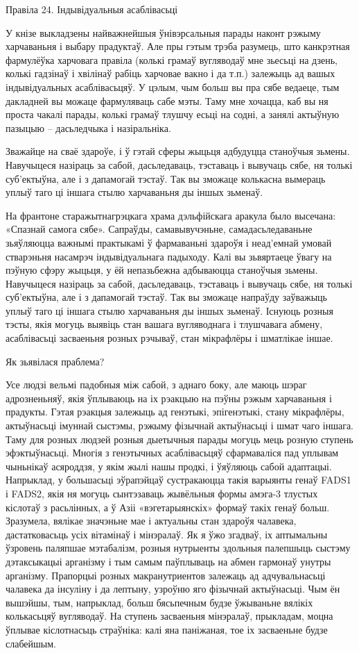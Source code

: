 Правіла 24. Індывідуальныя асаблівасьці

У кнізе выкладзены найважнейшыя ўнівэрсальныя парады наконт рэжыму харчаваньня і выбару прадуктаў. Але пры гэтым трэба разумець, што канкрэтная фармулёўка харчовага правіла (колькі грамаў вугляводаў мне зьесьці на дзень, колькі гадзінаў і хвілінаў рабіць харчовае вакно і да т.п.) залежыць ад вашых індывідуальных асаблівасьцяў. У цэлым, чым больш вы пра сябе ведаеце, тым дакладней вы можаце фармуляваць сабе мэты. Таму мне хочацца, каб вы ня проста чакалі парады, колькі грамаў тлушчу есьці на содні, а занялі актыўную пазыцыю – дасьледчыка і назіральніка.

Зважайце на сваё здароўе, і ў гэтай сферы жыцьця адбудуцца станоўчыя зьмены. Навучыцеся назіраць за сабой, дасьледаваць, тэставаць і вывучаць сябе, ня толькі суб'ектыўна, але і з дапамогай тэстаў. Так вы зможаце колькасна вымераць уплыў таго ці іншага стылю харчаваньня ды іншых зьменаў.

На франтоне старажытнагрэцкага храма дэльфійскага аракула было высечана: «Спазнай самога сябе». Сапраўды, самавывучэньне, самадасьледаваньне зьяўляюцца важнымі практыкамі ў фармаваньні здароўя і неад'емнай умовай стварэньня насамрэч індывідуальнага падыходу. Калі вы зьвяртаеце ўвагу на пэўную сфэру жыцьця, у ёй непазьбежна адбываюцца станоўчыя зьмены. Навучыцеся назіраць за сабой, дасьледаваць, тэставаць і вывучаць сябе, ня толькі суб'ектыўна, але і з дапамогай тэстаў. Так вы зможаце напраўду заўважыць уплыў таго ці іншага стылю харчаваньня ды іншых зьменаў. Існуюць розныя тэсты, якія могуць выявіць стан вашага вугляводнага і тлушчавага абмену, асаблівасьці засваеньня розных рэчываў, стан мікрафлёры і шматлікае іншае.

Як зьявілася праблема?

Усе людзі вельмі падобныя між сабой, з аднаго боку, але маюць шэраг адрозненьняў, якія ўплываюць на іх рэакцыю на пэўны рэжым харчаваньня і прадукты. Гэтая рэакцыя залежыць ад генэтыкі, эпігенэтыкі, стану мікрафлёры, актыўнасьці імуннай сыстэмы, рэжыму фізычнай актыўнасьці і шмат чаго іншага. Таму для розных людзей розныя дыетычныя парады могуць мець розную ступень эфэктыўнасьці.
Многія з генэтычных асаблівасьцяў сфармаваліся пад уплывам чыньнікаў асяроддзя, у якім жылі нашы продкі, і ўяўляюць сабой адаптацыі. Напрыклад, у большасьці эўрапэйцаў сустракаюцца такія варыянты генаў FADS1 і FADS2, якія ня могуць сынтэзаваць жывёльныя формы амэга-3 тлустых кіслотаў з расьлінных, а ў Азіі «вэгетарыянскіх» формаў такіх генаў больш.
Зразумела, вялікае значэньне мае і актуальны стан здароўя чалавека, дастатковасьць усіх вітамінаў і мінэралаў. Як я ўжо згадваў, іх аптымальны ўзровень паляпшае мэтабалізм, розныя нутрыенты здольныя палепшыць сыстэму дэтаксыкацыі арганізму і тым самым паўплываць на абмен гармонаў унутры арганізму. Прапорцыі розных макранутриентов залежаць ад адчувальнасьці чалавека да інсуліну і да лептыну, узроўню яго фізычнай актыўнасьці. Чым ён вышэйшы, тым, напрыклад, больш бясьпечным будзе ўжываньне вялікіх колькасьцяў вугляводаў. На ступень засваеньня мінэралаў, прыкладам, моцна ўплывае кіслотнасьць страўніка: калі яна паніжаная, тое іх засваеньне будзе слабейшым.

